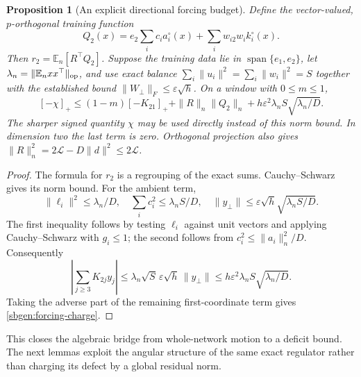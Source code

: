 \documentclass{article} %
\theoremstyle{plain}
\newtheorem{proposition}[theorem]{Proposition}
\theoremstyle{definition}
\theoremstyle{remark}
\begin{document}
\begin{proposition}[An explicit directional forcing budget]
\label{sbgen:forcing-budget}
Define the vector-valued, $p$-orthogonal training function
\[
 Q_2(x)=e_2\sum_i c_i a_i^\circ(x)
                   +\sum_i w_{i2}w_i k_i^\circ(x).
\]
Then $r_2=\mathbb E_n[R^\top Q_2]$. Suppose the training data lie in
$\operatorname{span}\{e_1,e_2\}$, let
$\lambda_n=\|\mathbb E_nxx^\top\|_{\rm op}$, and use exact balance
$\sum_i\|u_i\|^2=\sum_i\|w_i\|^2=S$ together with the established
bound $\|W_\perp\|_F\le\varepsilon\sqrt h$.
On a window with $0\le m\le1$,
\begin{equation}\label{sbgen:forcing-charge}
 [-\chi]_+\le
 (1-m)[-K_{21}]_+
 +\|R\|_n\|Q_2\|_n
 +h\varepsilon^2\lambda_n S\sqrt{\lambda_n/D}.
\end{equation}
The sharper signed quantity $\chi$ may be used directly instead of
this norm bound. In dimension two the last term is zero.
Orthogonal projection also gives
$\|R\|_n^2=2\mathcal L-D\|d\|^2\le2\mathcal L$.
\end{proposition}
\begin{proof}
The formula for $r_2$ is a regrouping of the exact sums.
Cauchy--Schwarz gives its norm bound. For the ambient term,
\[
 \|\ell_i\|^2\le\lambda_n/D,\quad
 \sum_i c_i^2\le\lambda_n S/D,\quad
 \|y_\perp\|\le\varepsilon\sqrt h\sqrt{\lambda_n S/D}.
\]
The first inequality follows by testing $\ell_i$ against unit vectors
and applying Cauchy--Schwarz with $g_i\le1$; the second follows from
$c_i^2\le\|a_i\|_n^2/D$.
Consequently
\[
 \left|\sum_{j\ge3}K_{2j}y_j\right|
 \le\lambda_n\sqrt S\,\varepsilon\sqrt h\,\|y_\perp\|
 \le h\varepsilon^2\lambda_n S\sqrt{\lambda_n/D}.
\]
Taking the adverse part of the remaining first-coordinate term gives
\eqref{sbgen:forcing-charge}.
\end{proof}

This closes the algebraic bridge from whole-network motion to a deficit
bound.  The next lemmas exploit the angular structure of the same exact
regulator rather than charging its defect by a global residual norm.
\end{document}
